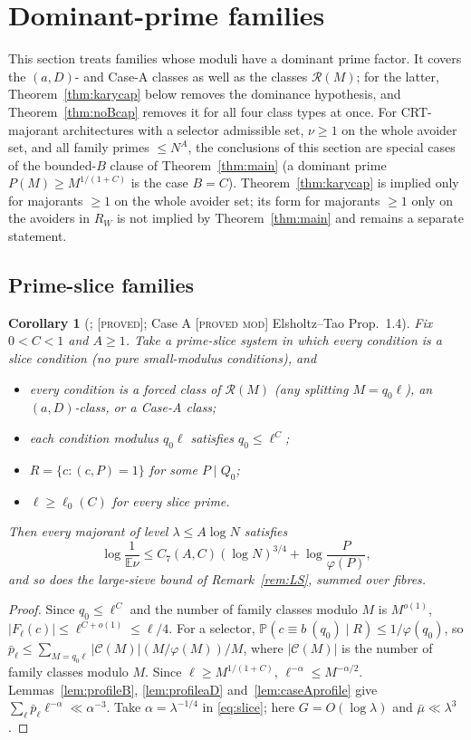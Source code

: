 \documentclass[10pt,reqno]{amsart}
\newtheorem{corollary}[theorem]{Corollary}
\theoremstyle{definition}
\theoremstyle{remark}
\newcommand{\cR}{\mathscr R}
\newcommand{\E}{\mathbb E}
\newcommand{\Prob}{\mathbb P}
\newcommand{\lab}[1]{\textup{[\textsc{#1}]}}
\begin{document}
\section{Dominant-prime families}\label{sec:cap}

This section treats families whose moduli have a dominant prime factor.
It covers the $(a,D)$- and Case-A classes as well as the classes
$\cR(M)$; for the latter, Theorem~\ref{thm:karycap} below removes the
dominance hypothesis, and Theorem~\ref{thm:noBcap} removes it for all
four class types at once.  For CRT-majorant architectures with a
selector admissible set, $\nu\geq1$ on the whole avoider set, and all
family primes $\leq N^A$, the conclusions of this section are special
cases of the bounded-$B$ clause of Theorem~\ref{thm:main} (a dominant
prime $P(M)\geq M^{1/(1+C)}$ is the case $B=C$).  Theorem~\ref{thm:karycap}
is implied only for majorants $\geq1$ on the whole avoider set; its
form for majorants $\geq1$ only on the avoiders in $R_W$ is not implied
by Theorem~\ref{thm:main} and remains a separate statement.

\subsection{Prime-slice families}
\begin{corollary}[{\cite[Cor.~3.4]{ET}}; \lab{proved}; Case A \lab{proved mod} Elsholtz--Tao Prop.~1.4]\label{cor:sliceCap}
Fix $0<C<1$ and $A\geq1$.  Take a prime-slice system in which every
condition is a slice condition (no pure small-modulus conditions), and
\begin{itemize}
\item every condition is a forced class of $\cR(M)$ (any splitting
  $M=q_0\ell$), an $(a,D)$-class, or a Case-A class;
\item each condition modulus $q_0\ell$ satisfies $q_0\leq\ell^C$;
\item $R=\{c:(c,P)=1\}$ for some $P\mid Q_0$;
\item $\ell\geq\ell_0(C)$ for every slice prime.
\end{itemize}
Then every majorant of level $\lambda\leq A\log N$ satisfies
\[
 \log\frac1{\E\nu}\leq C_7(A,C)(\log N)^{3/4}+\log\frac P{\varphi(P)},
\]
and so does the large-sieve bound of Remark~\ref{rem:LS}, summed over
fibres.
\end{corollary}
\begin{proof}
Since $q_0\leq\ell^C$ and the number of family classes modulo $M$ is
$M^{o(1)}$, $|F_\ell(c)|\leq\ell^{C+o(1)}\leq\ell/4$.  For a selector,
$\Prob(c\equiv b\ (q_0)\mid R)\leq1/\varphi(q_0)$, so
$\bar p_\ell\leq\sum_{M=q_0\ell}|\mathcal C(M)|(M/\varphi(M))/M$, where
$|\mathcal C(M)|$ is the number of family classes modulo $M$.  Since
$\ell\geq M^{1/(1+C)}$, $\ell^{-\alpha}\leq M^{-\alpha/2}$.
Lemmas~\ref{lem:profileB}, \ref{lem:profileaD} and~\ref{lem:caseAprofile}
give $\sum_\ell\bar p_\ell\ell^{-\alpha}\ll\alpha^{-3}$.  Take
$\alpha=\lambda^{-1/4}$ in \eqref{eq:slice}; here $G=O(\log\lambda)$ and
$\bar\mu\ll\lambda^3$.
\end{proof}
\end{document}
